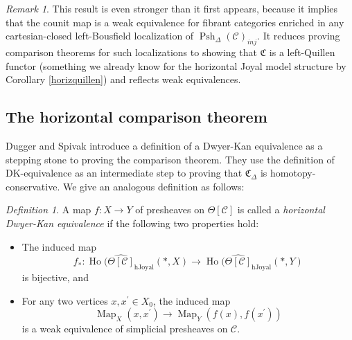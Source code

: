 \documentclass[leqno]{article}
\numberwithin{equation}{subsection}
\theoremstyle{plain}   %
\theoremstyle{remark}
\newtheorem{rem}[equation]{Remark}
\newtheorem{defn}[equation]{Definition}
\theoremstyle{plain}
\DeclareMathOperator{\Map}{Map}
\newcommand{\C}{\ensuremath{\mathcal{C}}}
\newcommand{\cellset}{\ensuremath{\widehat{\Theta[\mathcal{C}]}}}
\newcommand{\spsh}{\ensuremath{\operatorname{Psh}_\Delta(\mathcal{C})}}
\begin{document}
\begin{rem}
	This result is even stronger than it first appears, because it implies that the counit map is a weak equivalence for fibrant categories enriched in any cartesian-closed left-Bousfield localization of \(\spsh_{inj}\).  It reduces proving comparison theorems for such localizations to showing that \(\mathfrak{C}\) is a left-Quillen functor (something we already know for the horizontal Joyal model structure by Corollary \ref{horizquillen}) and reflects weak equivalences.
\end{rem}

\subsection{The horizontal comparison theorem}\label{horizcomparison}
Dugger and Spivak introduce a definition of a Dwyer-Kan equivalence as a stepping stone to proving the comparison theorem.  They use the definition of DK-equivalence as an intermediate step to proving that \(\mathfrak{C}_\Delta\) is homotopy-conservative.  We give an analogous definition as follows:

\begin{defn}
  A map \(f:X\to Y\) of presheaves on \(\Theta[\C]\) is called a \emph{horizontal Dwyer-Kan equivalence} if the following two properties hold:
	\begin{itemize}
		\item The induced map
		      \[f_*:\operatorname{Ho}(\cellset_{\mathrm{hJoyal}}(\ast,X) \to \operatorname{Ho}(\cellset_{\mathrm{hJoyal}}(\ast,Y)\]
		      is bijective, and
		\item For any two vertices \(x,x^\prime\in X_0\), the induced map
		      \[\Map_X(x,x^\prime) \to \Map_Y(f(x),f(x^\prime))\]
		      is a weak equivalence of simplicial presheaves on \(\C\).
	\end{itemize}
\end{defn}
\end{document}
